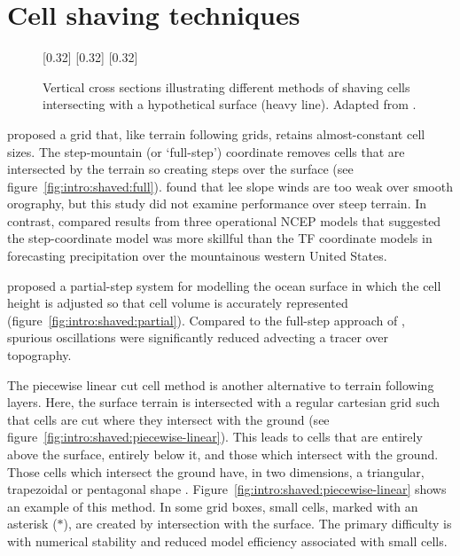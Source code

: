 \section{Cell shaving techniques}
\label{sec:theory:shaving}

\begin{figure}
	\captionsetup[subfigure]{position=b}
	\centering
	[0.32\textwidth]{}
	[0.32\textwidth]{}
	[0.32\textwidth]{}
	\caption{Vertical cross sections illustrating different methods of shaving cells intersecting with a hypothetical surface (heavy line).  Adapted from \textcite{adcroft1997}.}
	\label{fig:intro:shaved}
\end{figure}

\textcite{mesinger1988} proposed a grid that, like terrain following grids, retains almost-constant cell sizes.  The step-mountain (or `full-step') coordinate removes cells that are intersected by the terrain so creating steps over the surface (see figure~\ref{fig:intro:shaved:full}).  \textcite{gallus-klemp2000} found that lee slope winds are too weak over smooth orography, but this study did not examine performance over steep terrain.  In contrast, \textcite{mesinger2004} compared results from three operational NCEP models that suggested the step-coordinate model was more skillful than the TF coordinate models in forecasting precipitation over the mountainous western United States.

\textcite{adcroft1997} proposed a partial-step system for modelling the ocean surface in which the cell height is adjusted so that cell volume is accurately represented (figure~\ref{fig:intro:shaved:partial}).  Compared to the full-step approach of \textcite{mesinger1988}, spurious oscillations were significantly reduced advecting a tracer over topography.

The piecewise linear cut cell method is another alternative to terrain following layers.  Here, the surface terrain is intersected with a regular cartesian grid such that cells are cut where they intersect with the ground (see figure~\ref{fig:intro:shaved:piecewise-linear}).  
This leads to cells that are entirely above the surface, entirely below it, and those which intersect with the ground.  Those cells which intersect the ground have, in two dimensions, a triangular, trapezoidal or pentagonal shape \autocite{rosatti2005}.  Figure~\ref{fig:intro:shaved:piecewise-linear} shows an example of this method.  In some grid boxes, small cells, marked with an asterisk ($\ast$), are created by intersection with the surface.
The primary difficulty is with numerical stability and reduced model efficiency associated with small cells. 

